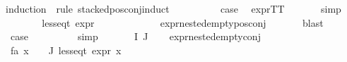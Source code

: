 \begin{isabellebody}
{\isacharparenleft}{\kern0pt}induction\ {\isasymphi}\ rule{\isacharcolon}{\kern0pt}\ stacked{\isacharunderscore}{\kern0pt}pos{\isacharunderscore}{\kern0pt}conj{\isachardot}{\kern0pt}induct{\isacharparenright}{\kern0pt}\isanewline
\ \ \isamarkupfalse%
\ {}\isanewline
\ \ \isamarkupfalse%
\ \isamarkupfalse%
\ {\isacharquery}{\kern0pt}case\ \isamarkupfalse%
\ expr{\isacharunderscore}{\kern0pt}TT\ \isanewline
\ \ \ \ \isamarkupfalse%
\ simp\isanewline
{}\isamarkupfalse%
\isanewline
\ \ \isamarkupfalse%
\ {\isacharparenleft}{\kern0pt}{}\ {\isasympsi}\ {\isasymalpha}{\isacharparenright}{\kern0pt}\isanewline
\ \ \isamarkupfalse%
\ {\isachardoublequoteopen}less{\isacharunderscore}{\kern0pt}eq{\isacharunderscore}{\kern0pt}t\ {\isacharparenleft}{\kern0pt}expr\ {\isasympsi}{\isacharparenright}{\kern0pt}\ {\isacharparenleft}{\kern0pt}{}{\isacharcomma}{\kern0pt}\ {\isasyminfinity}{\isacharcomma}{\kern0pt}\ {}{\isacharcomma}{\kern0pt}\ {}{\isacharcomma}{\kern0pt}\ {}{\isacharcomma}{\kern0pt}\ {}{\isacharparenright}{\kern0pt}{\isachardoublequoteclose}\isanewline
\ \ \ \ \isamarkupfalse%
\ expr{\isacharunderscore}{\kern0pt}nested{\isacharunderscore}{\kern0pt}empty{\isacharunderscore}{\kern0pt}pos{\isacharunderscore}{\kern0pt}conj\ {}\isanewline
\ \ \ \ \isamarkupfalse%
\ blast\isanewline
\ \ \isamarkupfalse%
\ \isamarkupfalse%
\ {\isacharquery}{\kern0pt}case\ \isamarkupfalse%
\ {}\ \isanewline
\ \ \ \ \isamarkupfalse%
\ simp\ \isanewline
{}\isamarkupfalse%
\isanewline
\ \ \isamarkupfalse%
\ {\isacharparenleft}{\kern0pt}{}\ {\isasymPhi}\ I\ J{\isacharparenright}{\kern0pt}\isanewline
\ \ \isamarkupfalse%
\ expr{\isacharunderscore}{\kern0pt}nested{\isacharunderscore}{\kern0pt}empty{\isacharunderscore}{\kern0pt}conj\ \isamarkupfalse%
\ fa{\isacharcolon}{\kern0pt}\ {\isachardoublequoteopen}{\isasymforall}x\ {\isasymin}\ {\isasymPhi}\ {\isacharbackquote}{\kern0pt}\ J{\isachardot}{\kern0pt}\ less{\isacharunderscore}{\kern0pt}eq{\isacharunderscore}{\kern0pt}t\ {\isacharparenleft}{\kern0pt}expr\ x{\isacharparenright}{\kern0pt}\ {\isacharparenleft}{\kern0pt}{}{\isacharcomma}{\kern0pt}\ {\isasyminfinity}{\isacharcomma}{\kern0pt}\ {}{\isacharcomma}{\kern0pt}\ {}{\isacharcomma}{\kern0pt}\ {}{\isacharcomma}{\kern0pt}\ {}{\isacharparenright}{\kern0pt}{\isachardoublequoteclose}\isanewline

\end{isabellebody}
